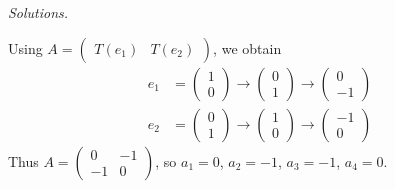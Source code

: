     \ifnum {} {\color{DarkBlue} \textit{Solutions.} 

    Using $A = \begin{pmatrix} T(e_1) & T(e_2) \end{pmatrix}$, we obtain
    \begin{align}
        e_1 &= \begin{pmatrix} 1\\0 \end{pmatrix} \to \begin{pmatrix}0\\1 \end{pmatrix}\to \begin{pmatrix}0\\-1 \end{pmatrix} 
        \\
        e_2 &= \begin{pmatrix} 0 \\1 \end{pmatrix} \to \begin{pmatrix} 1\\0 \end{pmatrix}\to \begin{pmatrix}-1\\0 \end{pmatrix}
    \end{align}
    Thus $A = \begin{pmatrix} 0 & -1\\-1 & 0 \end{pmatrix}$, so $a_1=0$, $a_2=-1$, $a_3=-1$, $a_4=0$.  
    } 
   \else
   \fi
\fi     

